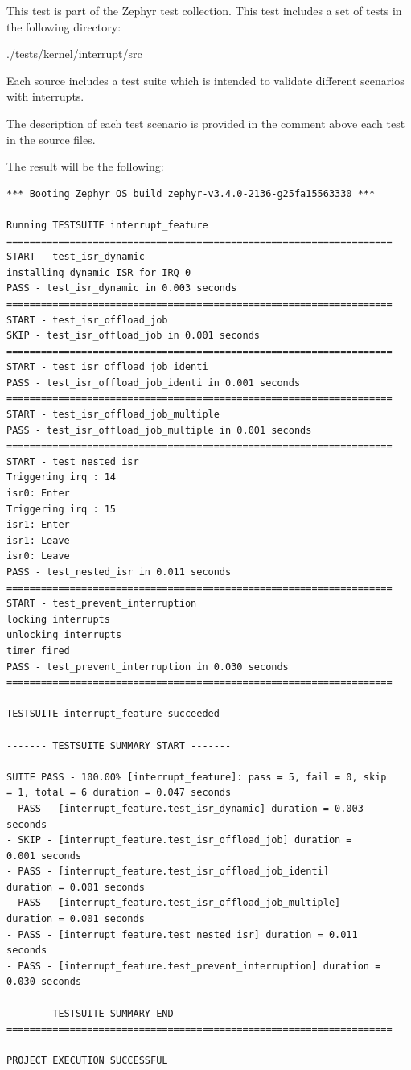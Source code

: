 \documentclass[11pt,a4paper,oneside]{article}
\begin{document}
This test is part of the Zephyr test collection. This test includes a
set of tests in the following directory:

./tests/kernel/interrupt/src

Each source includes a test suite which is intended to validate
different scenarios with interrupts.

The description of each test scenario is provided in the comment above
each test in the source files.

The result will be the following:

\begin{lstlisting}
*** Booting Zephyr OS build zephyr-v3.4.0-2136-g25fa15563330 ***

Running TESTSUITE interrupt_feature
===================================================================
START - test_isr_dynamic
installing dynamic ISR for IRQ 0
PASS - test_isr_dynamic in 0.003 seconds
===================================================================
START - test_isr_offload_job
SKIP - test_isr_offload_job in 0.001 seconds
===================================================================
START - test_isr_offload_job_identi
PASS - test_isr_offload_job_identi in 0.001 seconds
===================================================================
START - test_isr_offload_job_multiple
PASS - test_isr_offload_job_multiple in 0.001 seconds
===================================================================
START - test_nested_isr
Triggering irq : 14
isr0: Enter
Triggering irq : 15
isr1: Enter
isr1: Leave
isr0: Leave
PASS - test_nested_isr in 0.011 seconds
===================================================================
START - test_prevent_interruption
locking interrupts
unlocking interrupts
timer fired
PASS - test_prevent_interruption in 0.030 seconds
===================================================================

TESTSUITE interrupt_feature succeeded

------- TESTSUITE SUMMARY START -------

SUITE PASS - 100.00% [interrupt_feature]: pass = 5, fail = 0, skip
= 1, total = 6 duration = 0.047 seconds
- PASS - [interrupt_feature.test_isr_dynamic] duration = 0.003
seconds
- SKIP - [interrupt_feature.test_isr_offload_job] duration =
0.001 seconds
- PASS - [interrupt_feature.test_isr_offload_job_identi]
duration = 0.001 seconds
- PASS - [interrupt_feature.test_isr_offload_job_multiple]
duration = 0.001 seconds
- PASS - [interrupt_feature.test_nested_isr] duration = 0.011
seconds
- PASS - [interrupt_feature.test_prevent_interruption] duration =
0.030 seconds

------- TESTSUITE SUMMARY END -------
===================================================================

PROJECT EXECUTION SUCCESSFUL
\end{lstlisting}
\end{document}

